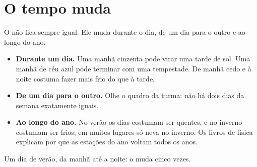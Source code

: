 \section{O tempo muda}

O  não fica sempre igual. Ele muda durante o dia, de um dia para o
outro e ao longo do ano.

\begin{itemize}
  \item \textbf{Durante um dia.} Uma manhã cinzenta pode virar uma tarde
        de sol. Uma manhã de céu azul pode terminar com uma tempestade.
        De manhã cedo e à noite costuma fazer mais frio do que à tarde.
  \item \textbf{De um dia para o outro.} Olhe o quadro da turma: não há
        dois dias da semana exatamente iguais.
  \item \textbf{Ao longo do ano.} No verão os dias costumam ser quentes,
        e no inverno costumam ser frios; em muitos lugares só neva no
        inverno. Os livros de física explicam por que as estações do ano
        voltam todos os anos.
\end{itemize}

\begin{omfigure}

{\small Um dia de verão, da manhã até a noite: o  muda cinco
vezes.}
\label{fig:g1:watching-the-weather:day}
\end{omfigure}

